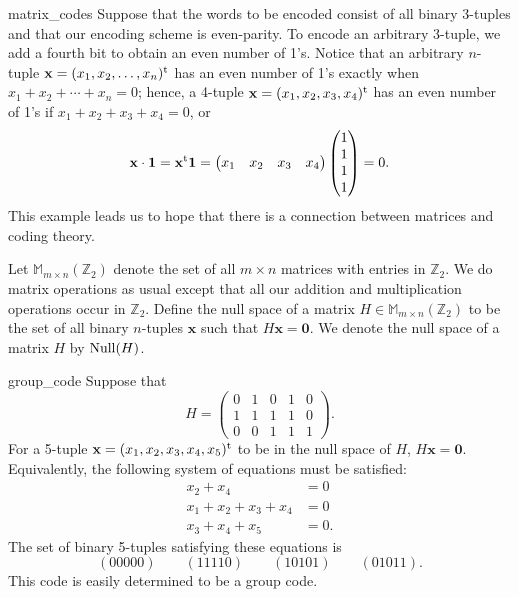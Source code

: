  
\begin{example}{matrix_codes}
Suppose that the words to be encoded consist of all binary
\mbox{3-tuples}
and that our encoding scheme is even-parity. To encode an arbitrary
3-tuple, we add a fourth bit to obtain an even number of 1's. Notice
that an arbitrary $n$-tuple ${\mathbf x} = (x_1, x_2, \ldots, x_n)^{\rm
t}$ has an even number of 1's exactly when $x_1 + x_2 + \cdots + x_n =
0$; hence, a 4-tuple ${\mathbf x} = (x_1, x_2, x_3, x_4)^{\rm t}$ has an
even number of 1's if $ x_1+ x_2+ x_3+ x_4 = 0$, or 
\[
{\mathbf x} \cdot {\mathbf 1} 
= 
{\mathbf x}^{\rm t} {\mathbf 1} 
=
\begin{pmatrix}
x_1 & x_2 & x_3 & x_4
\end{pmatrix}
\begin{pmatrix}
1 \\ 1 \\ 1 \\ 1
\end{pmatrix} = 0.
\]
This example leads us to hope that there is a connection between
matrices and coding theory. 
\end{example}
 
 
Let ${\mathbb M}_{m \times n}({\mathbb Z}_2)$\label{notembyn} denote the set
of all $m \times n$ matrices with entries in ${\mathbb Z}_2$. We do
matrix operations as usual except that all our addition and multiplication
operations occur in ${\mathbb Z}_2$. Define the {\bfi null
space\/} of 
a matrix $H \in {\mathbb M}_{m \times n}({\mathbb Z}_2)$ to be the set of
all binary $n$-tuples ${\mathbf x}$ such that $H{\mathbf x} = {\mathbf 0}$.
We denote the null space of a matrix $H$ by ${\rm Null}(H)$\label{notenull}.  
 
 
\begin{example}{group_code}
Suppose that
\[
H =
\begin{pmatrix}
0 & 1 & 0 & 1 & 0 \\
1 & 1 & 1 & 1 & 0 \\
0 & 0 & 1 & 1 & 1
\end{pmatrix}.
\]
For a 5-tuple ${\mathbf x} = (x_1, x_2, x_3, x_4, x_5)^{\rm t}$ to be in
the null space of $H$, $H{\mathbf x} = {\mathbf 0}$. Equivalently, the
following system of equations must be satisfied:   
\begin{align*}
  x_2 +  x_4  & =  0 \\
x_1 +  x_2 + x_3  + x_4   & =  0 \\
  x_3  + x_4  +  x_5 & =  0.
\end{align*}
The set of binary 5-tuples satisfying these equations is
\[
(00000) \qquad (11110) \qquad (10101) \qquad (01011).
\]
This code is easily determined to be a group code.
\end{example}
 
